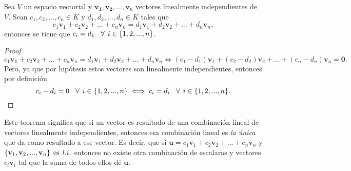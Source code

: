 \documentclass[12pt,dvipsnames]{article}
\newenvironment{teorema}[2][Teorema]{\begin{trivlist}
\item[\hskip \labelsep {\bfseries #1}\hskip \labelsep {\bfseries #2.}]}{\end{trivlist}}
\begin{document}
\begin{teorema} {3.3.3.1} 

    Sea $V$ un espacio vectorial y $\mathbf{v_1}, \mathbf{v_2}, ..., \mathbf{v}_n$ vectores linealmente independientes de $V$. Sean $c_1, c_2, ..., c_n\in K$ y $d_1, d_2, ..., d_n\in K$ tales que $$c_1\mathbf{v}_1+c_2\mathbf{v}_2+...+c_n\mathbf{v}_n=d_1\mathbf{v}_1+d_2\mathbf{v}_2+...+d_n\mathbf{v}_n,$$ entonces se tiene que $c_i=d_1\hspace{3mm}\forall\hspace{1.5mm}i\in\{1,2, ..., n\}$.

    \begin{proof}

        $$c_1\mathbf{v_1}+c_2\mathbf{v}_2+...+c_n\mathbf{v}_n=d_1\mathbf{v}_1+d_2\mathbf{v}_2+...+d_n\mathbf{v}_n\iff(c_1-d_1)\mathbf{v}_1+(c_2-d_2)\mathbf{v}_2+...+(c_n-d_n)\mathbf{v}_n=\mathbf{0}.$$ Pero, ya que por hipótesis estos vectores son linealmente independientes, entonces por definición $$c_i-d_i=0\hspace{3mm}\forall\hspace{1.5mm}i\in\{1,2, ...,n\}\iff c_i=d_i\hspace{3mm}\forall\hspace{1.5mm}i\in\{1,2, ...,n\}.$$

    \end{proof}

    Este teorema significa que si un vector es resultado de una combinación lineal de vectores linealmente independientes, entonces esa combinación lineal es \emph{la única} que da como resultado a ese vector. Es decir, que si $\mathbf{u}=c_1\mathbf{v}_1+c_2\mathbf{v}_2+...+c_n\mathbf{v}_n$ y $\{\mathbf{v}_1,\mathbf{v}_2, ...,\mathbf{v}_n\}\hspace{1.5mm}\text{es}\hspace{1.5mm} l.i.$ entonces no existe otra combinación de escalaras y vectores $c_i \mathbf{v}_i$ tal que la suma de todos ellos dé $\mathbf{u}$.

\end{teorema}
\end{document}
